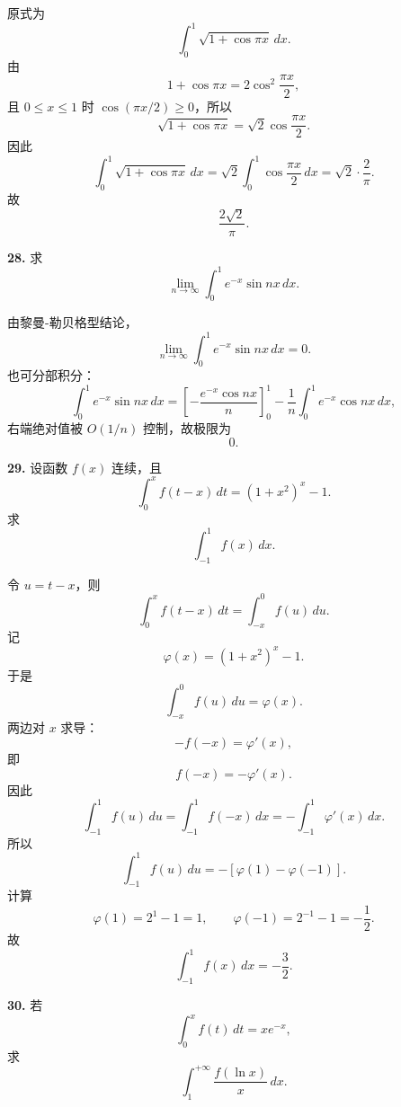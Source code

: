 \begin{solutionblock}
原式为
\[
\int_0^1\sqrt{1+\cos\pi x}\,dx.
\]
由
\[
1+\cos\pi x=2\cos^2\frac{\pi x}{2},
\]
且 \(0\le x\le1\) 时 \(\cos(\pi x/2)\ge0\)，所以
\[
\sqrt{1+\cos\pi x}=\sqrt2\cos\frac{\pi x}{2}.
\]
因此
\[
\int_0^1\sqrt{1+\cos\pi x}\,dx
=\sqrt2\int_0^1\cos\frac{\pi x}{2}\,dx
=\sqrt2\cdot\frac{2}{\pi}.
\]
故
\[
\boxed{\frac{2\sqrt2}{\pi}}.
\]
\end{solutionblock}

\begin{problemblock}
\textbf{28.} 求
\[
\lim_{n\to\infty}\int_0^1 e^{-x}\sin nx\,dx.
\]
\end{problemblock}

\begin{solutionblock}
由黎曼-勒贝格型结论，
\[
\lim_{n\to\infty}\int_0^1 e^{-x}\sin nx\,dx=0.
\]
也可分部积分：
\[
\int_0^1 e^{-x}\sin nx\,dx
=\left[-\frac{e^{-x}\cos nx}{n}\right]_0^1
-\frac1n\int_0^1 e^{-x}\cos nx\,dx,
\]
右端绝对值被 \(O(1/n)\) 控制，故极限为
\[
\boxed{0}.
\]
\end{solutionblock}

\begin{problemblock}
\textbf{29.} 设函数 \(f(x)\) 连续，且
\[
\int_0^x f(t-x)\,dt=(1+x^2)^x-1.
\]
求
\[
\int_{-1}^{1}f(x)\,dx.
\]
\end{problemblock}

\begin{solutionblock}
令 \(u=t-x\)，则
\[
\int_0^x f(t-x)\,dt=\int_{-x}^0 f(u)\,du.
\]
记
\[
\varphi(x)=(1+x^2)^x-1.
\]
于是
\[
\int_{-x}^0 f(u)\,du=\varphi(x).
\]
两边对 \(x\) 求导：
\[
-f(-x)=\varphi'(x),
\]
即
\[
f(-x)=-\varphi'(x).
\]
因此
\[
\int_{-1}^{1}f(u)\,du
=\int_{-1}^{1}f(-x)\,dx
=-\int_{-1}^{1}\varphi'(x)\,dx.
\]
所以
\[
\int_{-1}^{1}f(u)\,du
=-[\varphi(1)-\varphi(-1)].
\]
计算
\[
\varphi(1)=2^1-1=1,\qquad
\varphi(-1)=2^{-1}-1=-\frac12.
\]
故
\[
\boxed{\int_{-1}^{1}f(x)\,dx=-\frac32}.
\]
\end{solutionblock}

\begin{problemblock}
\textbf{30.} 若
\[
\int_0^x f(t)\,dt=xe^{-x},
\]
求
\[
\int_1^{+\infty}\frac{f(\ln x)}{x}\,dx.
\]
\end{problemblock}

